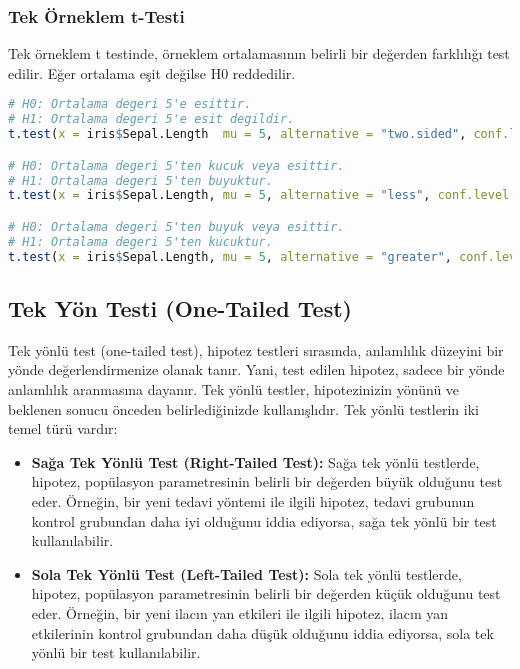 \subsubsection{Tek Örneklem t-Testi}
Tek örneklem t testinde, örneklem ortalamasının belirli bir değerden farklılığı test edilir. Eğer ortalama eşit değilse H0 reddedilir.

\begin{lstlisting}[language=R]
# H0: Ortalama degeri 5'e esittir.
# H1: Ortalama degeri 5'e esit degildir.
t.test(x = iris$Sepal.Length  mu = 5, alternative = "two.sided", conf.level = 0.95)

# H0: Ortalama degeri 5'ten kucuk veya esittir.
# H1: Ortalama degeri 5'ten buyuktur.
t.test(x = iris$Sepal.Length, mu = 5, alternative = "less", conf.level = 0.95)

# H0: Ortalama degeri 5'ten buyuk veya esittir.
# H1: Ortalama degeri 5'ten kucuktur.
t.test(x = iris$Sepal.Length, mu = 5, alternative = "greater", conf.level = 0.95)
\end{lstlisting}

\newpage

\subsection{Tek Yön Testi (One-Tailed Test)}
Tek yönlü test (one-tailed test), hipotez testleri sırasında, anlamlılık düzeyini bir yönde değerlendirmenize olanak tanır. Yani, test edilen hipotez, sadece bir yönde anlamlılık aranmasına dayanır. Tek yönlü testler, hipotezinizin yönünü ve beklenen sonucu önceden belirlediğinizde kullanışlıdır. Tek yönlü testlerin iki temel türü vardır:

\begin{itemize}
    \item \textbf{Sağa Tek Yönlü Test (Right-Tailed Test):} Sağa tek yönlü testlerde, hipotez, popülasyon parametresinin belirli bir değerden büyük olduğunu test eder. Örneğin, bir yeni tedavi yöntemi ile ilgili hipotez, tedavi grubunun kontrol grubundan daha iyi olduğunu iddia ediyorsa, sağa tek yönlü bir test kullanılabilir.
    \item \textbf{Sola Tek Yönlü Test (Left-Tailed Test):} Sola tek yönlü testlerde, hipotez, popülasyon parametresinin belirli bir değerden küçük olduğunu test eder. Örneğin, bir yeni ilacın yan etkileri ile ilgili hipotez, ilacın yan etkilerinin kontrol grubundan daha düşük olduğunu iddia ediyorsa, sola tek yönlü bir test kullanılabilir.
\end{itemize}

